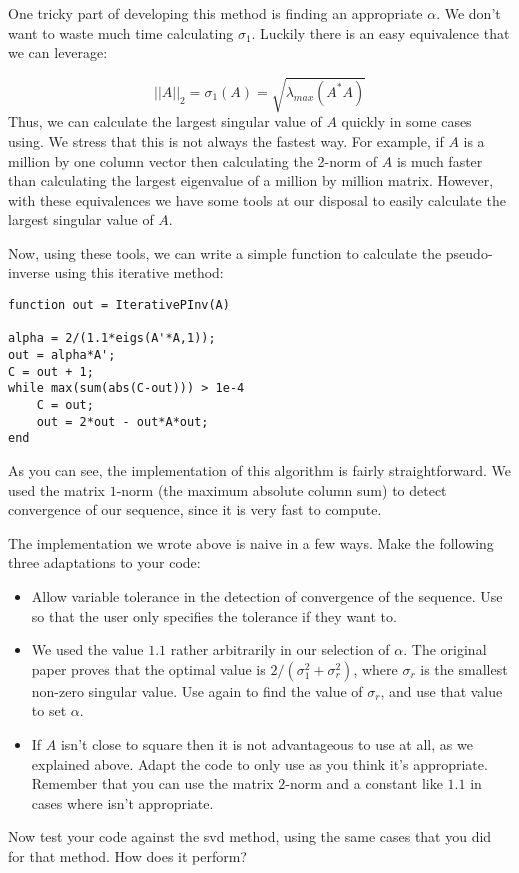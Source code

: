 One tricky part of developing this method is finding an appropriate $\alpha$. We don't want to waste much time calculating $\sigma_1$. Luckily there is an easy equivalence that we can leverage:

\[
||A||_2 = \sigma_1(A) = \sqrt{\lambda_{max} (A^* A)}
\]
Thus, we can calculate the largest singular value of $A$ quickly in some cases using. We stress that this is not always the fastest way. For example, if $A$ is a million by one column vector then calculating the 2-norm of $A$ is much faster than calculating the largest eigenvalue of a million by million matrix. However, with these equivalences we have some tools at our disposal to easily calculate the largest singular value of $A$.

Now, using these tools, we can write a simple function to calculate the pseudo-inverse using this iterative method:

\begin{lstlisting}[style=python]
function out = IterativePInv(A)

alpha = 2/(1.1*eigs(A'*A,1));
out = alpha*A';
C = out + 1;
while max(sum(abs(C-out))) > 1e-4
    C = out;
    out = 2*out - out*A*out;
end
\end{lstlisting}
As you can see, the implementation of this algorithm is fairly straightforward. We used the matrix $1$-norm (the maximum absolute column sum) to detect convergence of our sequence, since it is very fast to compute.

\begin{problem}
The implementation we wrote above is naive in a few ways. Make the following three adaptations to your code:
\begin{itemize}
\item Allow variable tolerance in the detection of convergence of the sequence. Use  so that the user only specifies the tolerance if they want to.
\item We used the value $1.1$ rather arbitrarily in our selection of $\alpha$. The original paper proves that the optimal value is $2/(\sigma_1^2 + \sigma_r^2)$, where $\sigma_r$ is the smallest non-zero singular value. Use again to find the value of $\sigma_r$, and use that value to set $\alpha$.
\item If $A$ isn't close to square then it is not advantageous to use at all, as we explained above. Adapt the code to only use  as you think it's appropriate. Remember that you can use the matrix $2$-norm and a constant like $1.1$ in cases where  isn't appropriate.
\end{itemize}

Now test your code against the svd method, using the same cases that you did for that method. How does it perform?
\end{problem}

